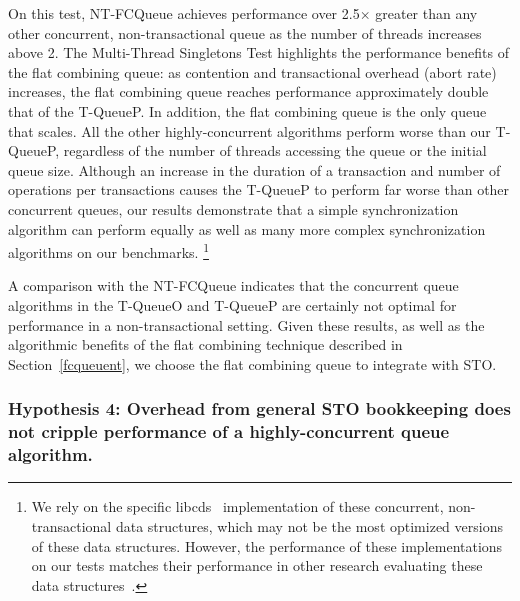 On this test, NT-FCQueue achieves performance over 2.5$\times$ greater than any other concurrent, non-transactional queue as the number of threads increases above 2. The Multi-Thread Singletons Test highlights the performance benefits of the flat combining queue: as contention and transactional overhead (abort rate) increases, the flat combining queue reaches performance approximately double that of the T-QueueP. In addition, the flat combining queue is the only queue that scales. All the other highly-concurrent algorithms perform worse than our T-QueueP, regardless of the number of threads accessing the queue or the initial queue size. 
Although an increase in the duration of a transaction and number of operations per transactions causes the T-QueueP to perform far worse than other concurrent queues, our results demonstrate that a simple synchronization algorithm can perform equally as well as many more complex synchronization algorithms on our benchmarks.
\footnote{We rely on the specific libcds~\cite{libcds} implementation of these concurrent, non-transactional data structures, which may not be the most optimized versions of these data structures. However, the performance of these implementations on our tests matches their performance in other research evaluating these data structures~\cite{queue1, queue3}.} 

A comparison with the NT-FCQueue indicates that the concurrent queue algorithms in the T-QueueO and T-QueueP are certainly not optimal for performance in a non-transactional setting.
Given these results, as well as the algorithmic benefits of the flat combining technique described in Section~\ref{fcqueuent}, we choose the flat combining queue to integrate with STO.

\vspace{12pt}
\noindent{}

\subsubsection{Hypothesis 4: Overhead from general STO bookkeeping does not cripple performance of a highly-concurrent queue algorithm.}

